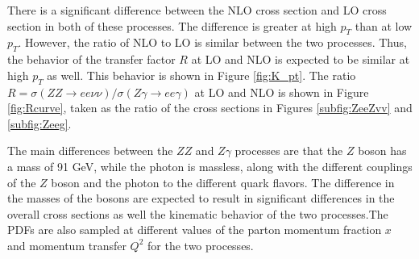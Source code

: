 \documentclass[12pt,a4paper,openright,twoside]{report}
\begin{document}
There is a significant difference between the NLO cross section and LO cross section in both of these processes. The difference is greater at high $p_T$ than at low $p_T$. However, the ratio of NLO to LO is similar between the two processes. Thus, the behavior of the transfer factor $R$ at LO and NLO is expected to be similar at high $p_T$ as well. This behavior is shown in Figure \ref{fig:K_pt}. The ratio $R = \sigma(ZZ\rightarrow ee\nu\nu)/\sigma(Z\gamma\rightarrow ee\gamma)$ at LO and NLO is shown in Figure \ref{fig:Rcurve}, taken as the ratio of the cross sections in Figures \ref{subfig:ZeeZvv} and \ref{subfig:Zeeg}.

The main differences between the $ZZ$ and $Z\gamma$ processes are that the $Z$ boson has a mass of 91 GeV, while the photon is massless, along with the different couplings of the $Z$ boson and the photon to the different quark flavors. The difference in the masses of the bosons are expected to result in significant differences in the overall cross sections as well the kinematic behavior of the two processes.The PDFs are also sampled at different values of the parton momentum fraction $x$ and momentum transfer $Q^2$ for the two processes. 
\end{document}
